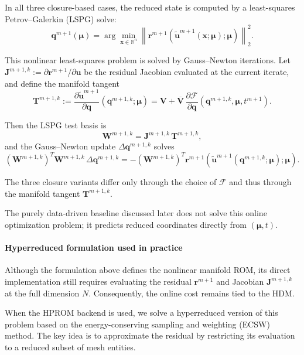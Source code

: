 \documentclass[11pt]{article}
\begin{document}
In all three closure-based cases, the reduced state is computed by a least-squares Petrov--Galerkin (LSPG) solve:
\begin{equation}
\mathbf q^{m+1}(\bm\mu)
=
\arg\min_{\mathbf x\in\mathbb R^{n}}
\left\|
\mathbf r^{m+1}\!\left(
\tilde{\mathbf u}^{m+1}(\mathbf x;\bm\mu);\bm\mu
\right)
\right\|_2^2.
\label{eq:lspg_min_problem}
\end{equation}

This nonlinear least-squares problem is solved by Gauss--Newton iterations. Let
$\mathbf J^{m+1,k}:=\partial \mathbf r^{m+1}/\partial \mathbf u$ be the residual Jacobian evaluated at the current iterate, and define the manifold tangent
\[
\mathbf T^{m+1,k}
:=
\frac{\partial \tilde{\mathbf u}^{m+1}}{\partial \mathbf q}(\mathbf q^{m+1,k};\bm\mu)
=
\mathbf V
+
\overline{\mathbf V}\,
\frac{\partial \mathcal F}{\partial \mathbf q}(\mathbf q^{m+1,k},\bm\mu,t^{m+1}).
\]

Then the LSPG test basis is
\[
\mathbf W^{m+1,k}
=
\mathbf J^{m+1,k}\,\mathbf T^{m+1,k},
\]
and the Gauss--Newton update $\Delta\mathbf q^{m+1,k}$ solves
\begin{equation}
(\mathbf W^{m+1,k})^T\mathbf W^{m+1,k}\,\Delta\mathbf q^{m+1,k}
=
-(\mathbf W^{m+1,k})^T
\mathbf r^{m+1}\!\left(\tilde{\mathbf u}^{m+1}(\mathbf q^{m+1,k};\bm\mu);\bm\mu\right).
\label{eq:lspg_gn_update}
\end{equation}

The three closure variants differ only through the choice of $\mathcal F$ and thus through the manifold tangent $\mathbf T^{m+1,k}$.

\medskip
\noindent
The purely data-driven baseline discussed later does not solve this online optimization problem; it predicts reduced coordinates directly from $(\bm\mu,t)$.

\paragraph{Hyperreduced formulation used in practice}

Although the formulation above defines the nonlinear manifold ROM, its direct implementation still requires evaluating the residual $\mathbf r^{m+1}$ and Jacobian $\mathbf J^{m+1,k}$ at the full dimension $N$. Consequently, the online cost remains tied to the HDM.

When the HPROM backend is used, we solve a hyperreduced version of this problem based on the energy-conserving sampling and weighting (ECSW) method. The key idea is to approximate the residual by restricting its evaluation to a reduced subset of mesh entities.
\end{document}
